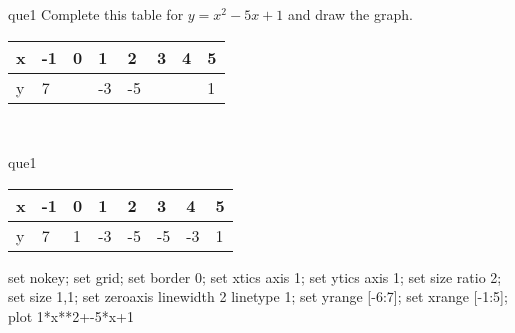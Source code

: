 \documentclass[13.5pt, varwidth=true]{beamer}
\begin{document}
\begin{frame}[shrink=19,fragile]
	\begin{beamercolorbox}[rounded=true, left, shadow=true,wd=14.8cm]{que1}
		 Complete this table for $y = x^{2} - 5x + 1$ and draw the graph. \\[0.3cm] \renewcommand{\arraystretch}{1.2}\begin{tabular}{|C|C|C|C|C|C|C|C|} \hline x & -1 & 0 & 1 & 2 & 3 & 4 & 5 \\ \hline y & 7 &  & -3 & -5 &  &  & 1\\ \hline \end{tabular}\\[0.3cm]
	\end{beamercolorbox}
\end{frame}
\begin{frame}[shrink=19,fragile]
	\begin{beamercolorbox}[rounded=true, left, shadow=true,wd=14.8cm]{que1}
		\renewcommand{\arraystretch}{1.2}\begin{tabular}{|C|C|C|C|C|C|C|C|} \hline x & -1 & 0 & 1 & 2 & 3 & 4 & 5 \\ \hline y & 7 & 1 & -3 & -5 & -5 & -3 & 1\\ \hline \end{tabular}\begin{gnuplot}[terminal=pdf] set nokey; set grid; set border 0; set xtics axis 1; set ytics axis 1; set size ratio 2; set size 1,1; set zeroaxis linewidth 2 linetype 1; set yrange [-6:7]; set xrange [-1:5]; plot 1*x**2+-5*x+1 \end{gnuplot}
	\end{beamercolorbox}
\end{frame}
\end{document}
